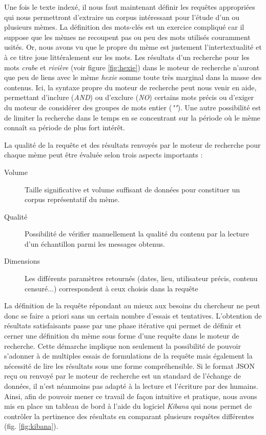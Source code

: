     Une fois le texte indexé, il nous faut maintenant définir les requêtes appropriées qui nous permettront d'extraire un corpus intéressant pour l'étude d'un ou plusieurs mèmes. La définition des mots-clés est un exercice compliqué car il suppose que les mèmes ne recoupent pas ou peu des mots utilisés couramment usités. Or, nous avons vu que le propre du mème est justement l'intertextualité et à ce titre joue littéralement sur les mots. Les résultats d'un recherche pour les mots \textit{crabe} et \textit{rivière} (voir figure \ref{fig:hexie}) dans le moteur de recherche n'auront que peu de liens avec le mème \textit{hexie} somme toute très marginal dans la masse des contenus. Ici, la syntaxe propre du moteur de recherche peut nous venir en aide, permettant d'inclure (\textit{AND}) ou d'exclure (\textit{NO}) certains mots précis ou d'exiger du moteur de considérer des groupes de mots entier (\textit{""}). Une autre possibilité est de limiter la recherche dans le temps en se concentrant sur la période où le  mème connaît sa période de plus fort intérêt.

    La qualité de la requête et des résultats renvoyés par le moteur de recherche pour chaque mème peut être évaluée selon trois aspects importants :

    \begin{description}
        \item[Volume]
            Taille significative et volume suffisant de données pour constituer un corpus représentatif du mème.
        \item[Qualité]
            Possibilité de vérifier manuellement la qualité du contenu par la lecture d{\textquoteright}un échantillon parmi les messages obtenus.
        \item[Dimensions]
            Les différents paramètres retournés (dates, lieu, utilisateur précis, contenu censuré...) correspondent à ceux choisis dans la requête
    \end{description}

    La définition de la requête répondant au mieux aux besoins du chercheur  ne peut donc se faire a priori sans un certain nombre d'essais et tentatives. L'obtention de résultats satisfaisants passe par une phase itérative qui permet de définir et cerner une définition du mème sous forme d'une requête dans le moteur de recherche. Cette démarche implique non seulement la possibilité de pouvoir s'adonner à de multiples essais de formulations de la requête mais également la nécessité de lire les résultats sous une forme compréhensible. Si le format JSON reçu ou renvoyé par le moteur de recherche est un standard de l'échange de données, il n'est néanmoins pas adapté à la lecture et l'écriture par des humains. Ainsi, afin de pouvoir mener ce travail de façon intuitive et pratique, nous avons mis en place un tableau de bord à l'aide du logiciel \textit{Kibana} qui nous permet de contr\^oler la pertinence des résultats en comparant plusieurs requêtes différentes (fig. \ref{fig:kibana}).

